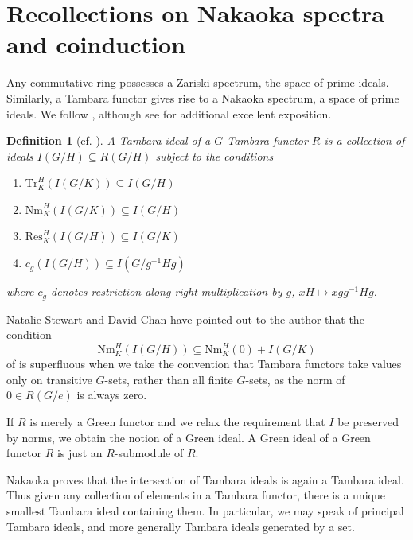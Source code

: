 \documentclass[11pt,dvipsnames]{amsart}
\theoremstyle{BoldRemark}
\newtheorem{definition}[theorem]{Definition}
\renewcommand{\subset}{\subseteq}
\begin{document}
\section{Recollections on Nakaoka spectra and coinduction}

Any commutative ring possesses a Zariski spectrum, the space of prime ideals. Similarly, a Tambara functor gives rise to a Nakaoka spectrum, a space of prime ideals. We follow \cite{Nak11a}, although see \cite{4DS} for additional excellent exposition.

\begin{definition}[{cf. \cite[Definition 2.1]{Nak11a}}]
	A \emph{Tambara ideal} of a $G$-Tambara functor $R$ is a collection of ideals $I(G/H) \subset R(G/H)$ subject to the conditions
	\begin{enumerate}
		\item $\mathrm{Tr}_K^H \left( I(G/K) \right)  \subset I(G/H)$
		\item $\mathrm{Nm}_K^H \left( I(G/K) \right) \subset I(G/H)$
		\item $\mathrm{Res}_K^H \left( I(G/H) \right) \subset I(G/K)$
		\item $c_g \left( I(G/H) \right) \subset I(G/g^{-1}Hg)$
	\end{enumerate}
	where $c_g$ denotes restriction along right multiplication by $g$, $xH \mapsto xgg^{-1}Hg$.
\end{definition}

Natalie Stewart and David Chan have pointed out to the author that the condition 
\[
	\mathrm{Nm}_K^H \left( I(G/H) \right) \subset \mathrm{Nm}_K^H(0) + I(G/K)
\] 
of \cite[Definition 2.1]{Nak11a} is superfluous when we take the convention that Tambara functors take values only on transitive $G$-sets, rather than all finite $G$-sets, as the norm of $0 \in R(G/e)$ is always zero.

If $R$ is merely a Green functor and we relax the requirement that $I$ be preserved by norms, we obtain the notion of a Green ideal. A Green ideal of a Green functor $R$ is just an $R$-submodule of $R$.

Nakaoka proves that the intersection of Tambara ideals is again a Tambara ideal. Thus given any collection of elements in a Tambara functor, there is a unique smallest Tambara ideal containing them. In particular, we may speak of principal Tambara ideals, and more generally Tambara ideals generated by a set.
\end{document}

